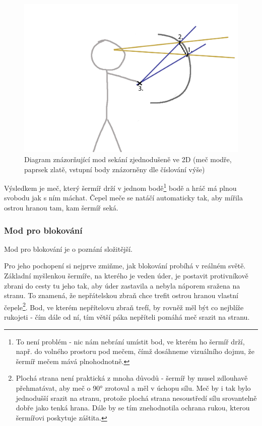 \begin{figure}[ht]\centering
    \center
    \includegraphics[width=140mm]{../img/diagram-slashingMode.png}
    \caption{Diagram znázorňující mod sekání zjednodušeně ve 2D (meč modře, paprsek zlatě, vstupní body znázorněny dle číslování výše)}
    \label{obr04:swordSlashingMode2D}
\end{figure} 
 
Výsledkem je meč, který šermíř drží v jednom bodě\footnote{To není problém - nic nám nebrání umístit bod, ve kterém ho šermíř drží, např. do volného prostoru pod mečem, čímž dosáhneme vizuálního dojmu, že šermíř mečem mává plnohodnotně.} bodě a hráč má plnou svobodu jak s ním máchat. Čepel meče se natáčí automaticky tak, aby mířila ostrou hranou tam, kam šermíř seká.

\subsubsection*{Mod pro blokování}

Mod pro blokování je o poznání složitější.

Pro jeho pochopení si nejprve zmiňme, jak blokování probíhá v reálném světě. Základní myšlenkou šermíře, na kterého je veden úder, je postavit protivníkově zbrani do cesty tu jeho tak, aby úder zastavila a nebyla náporem sražena na stranu. To znamená, že nepřátelskou zbraň chce trefit ostrou hranou vlastní čepele\footnote{Plochá strana není praktická z mnoha důvodů - šermíř by musel zdlouhavě přehmatávat, aby meč o 90° zrotoval a měl v úchopu sílu. Meč by i tak bylo jednodušší srazit na stranu, protože plochá strana nesoustředí sílu srovantelně dobře jako tenká hrana. Dále by se tím znehodnotila ochrana rukou, kterou šermířovi poskytuje záštita.}. Bod, ve kterém nepřítelovu zbraň trefí, by rovněž měl být co nejblíže rukojeti - čím dále od ní, tím větší páka nepříteli pomáhá meč srazit na stranu.

